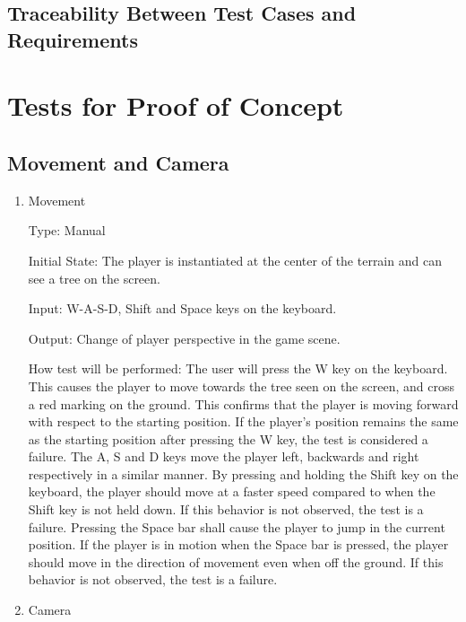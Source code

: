 \documentclass[12pt, titlepage]{article}
\begin{document}
\subsection{Traceability Between Test Cases and Requirements}

\section{Tests for Proof of Concept}

\subsection{Movement and Camera}
		
\begin{enumerate}

\item{Movement\\}

Type: Manual
					
Initial State: The player is instantiated at the center of the terrain and can see a tree on the screen.
					
Input: W-A-S-D, Shift and Space keys on the keyboard.
					
Output: Change of player perspective in the game scene.
					
How test will be performed:
The user will press the W key on the keyboard. This causes the player to move towards the tree seen on the screen, and cross a red marking on the ground. This confirms that the player is moving forward with respect to the starting position. If the player's position remains the same as the starting position after pressing the W key, the test is considered a failure. The A, S and D keys move the player left, backwards and right respectively in a similar manner.
\newline
By pressing and holding the Shift key on the keyboard, the player should move at a faster speed compared to when the Shift key is not held down. If this behavior is not observed, the test is a failure.\newline
Pressing the Space bar shall cause the player to jump in the current position. If the player is in motion when the Space bar is pressed, the player should move in the direction of movement even when off the ground. If this behavior is not observed, the test is a failure.
					
\item{Camera\\}


\end{enumerate}
\end{document}
